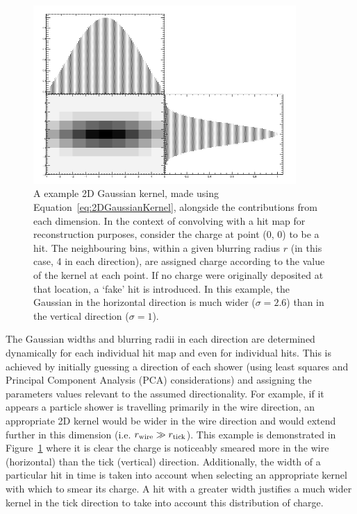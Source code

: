 \begin{figure}
  \centering
  \includegraphics[width=10cm]{2DGaussianKernel.png}
  \caption[A example 2D Gaussian kernel alongside the contributions from each dimension.]{A example 2D Gaussian kernel, made using Equation~\ref{eq:2DGaussianKernel}, alongside the contributions from each dimension.  In the context of convolving with a hit map for reconstruction purposes, consider the charge at point (0, 0) to be a hit.  The neighbouring bins, within a given blurring radius $r$ (in this case, 4 in each direction), are assigned charge according to the value of the kernel at each point.  If no charge were originally deposited at that location, a `fake' hit is introduced.  In this example, the Gaussian in the horizontal direction is much wider ($\sigma=2.6$) than in the vertical direction ($\sigma=1$).}
  \label{fig:2DGaussianKernel}
\end{figure}

The Gaussian widths and blurring radii in each direction are determined dynamically for each individual hit map and even for individual hits.  This is achieved by initially guessing a direction of each shower (using least squares and Principal Component Analysis (PCA) considerations) and assigning the parameters values relevant to the assumed directionality.  For example, if it appears a particle shower is travelling primarily in the wire direction, an appropriate 2D kernel would be wider in the wire direction and would extend further in this dimension (i.e. $r_{\textnormal{wire}} \gg r_{\textnormal{tick}}$).  This example is demonstrated in Figure~\ref{fig:2DGaussianKernel} where it is clear the charge is noticeably smeared more in the wire (horizontal) than the tick (vertical) direction.  Additionally, the width of a particular hit in time is taken into account when selecting an appropriate kernel with which to smear its charge.  A hit with a greater width justifies a much wider kernel in the tick direction to take into account this distribution of charge.

